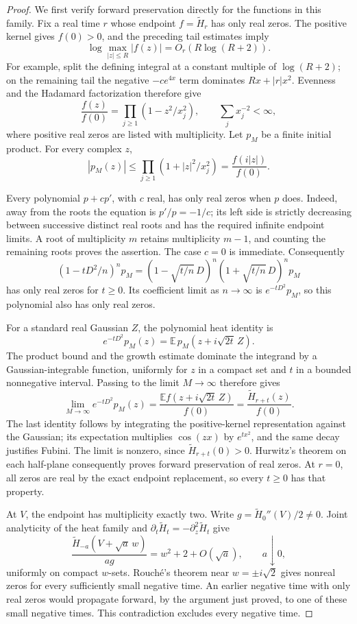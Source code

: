 \begin{proof}
We first verify forward preservation directly for the functions in
this family. Fix a real time \(r\) whose endpoint
\(f=\widetilde H_r\) has only real zeros. The positive kernel gives
\(f(0)>0\), and the preceding tail estimates imply
\[
 \log\max_{|z|\le R}|f(z)|=O_r(R\log(R+2)).
\]
For example, split the defining integral at a constant multiple of
\(\log(R+2)\); on the remaining tail the negative
\(-c e^{4x}\) term dominates \(Rx+|r|x^2\).
Evenness and the Hadamard factorization therefore give
\[
 \frac{f(z)}{f(0)}=\prod_{j\ge1}(1-z^2/x_j^2),
 \qquad \sum_jx_j^{-2}<\infty,
\]
where positive real zeros are listed with multiplicity.
Let \(p_M\) be a finite initial product. For every complex \(z\),
\[
 |p_M(z)|\le\prod_{j\ge1}(1+|z|^2/x_j^2)
             =\frac{f(i|z|)}{f(0)}.
\]

Every polynomial \(p+c p'\), with \(c\) real, has only real zeros
when \(p\) does. Indeed, away from the roots the equation is
\(p'/p=-1/c\); its left side is strictly decreasing between
successive distinct real roots and has the required infinite
endpoint limits. A root of multiplicity \(m\) retains
multiplicity \(m-1\), and counting the remaining roots proves
the assertion. The case \(c=0\) is immediate.
Consequently
\[
 (1-tD^2/n)^n p_M
 = (1-\sqrt{t/n}\,D)^n(1+\sqrt{t/n}\,D)^n p_M
\]
has only real zeros for \(t\ge0\).
Its coefficient limit as \(n\to\infty\) is
\(e^{-tD^2}p_M\), so this polynomial also has only real zeros.

For a standard real Gaussian \(Z\), the polynomial heat identity is
\[
 e^{-tD^2}p_M(z)=\mathbb E\,p_M(z+i\sqrt{2t}\,Z).
\]
The product bound and the growth estimate dominate the integrand
by a Gaussian-integrable function, uniformly for \(z\) in a compact
set and \(t\) in a bounded nonnegative interval. Passing to the
limit \(M\to\infty\) therefore gives
\[
 \lim_{M\to\infty}e^{-tD^2}p_M(z)
 =\frac{\mathbb E f(z+i\sqrt{2t}\,Z)}{f(0)}
 =\frac{\widetilde H_{r+t}(z)}{f(0)}.
\]
The last identity follows by integrating the positive-kernel
representation against the Gaussian; its expectation multiplies
\(\cos(zx)\) by \(e^{t x^2}\), and the same decay justifies Fubini.
The limit is nonzero, since \(\widetilde H_{r+t}(0)>0\).
Hurwitz's theorem on each half-plane consequently proves forward
preservation of real zeros. At \(r=0\), all zeros are real by the
exact endpoint replacement, so every \(t\ge0\) has that property.

At \(V\), the endpoint has multiplicity exactly two. Write
\(g=\widetilde H_0''(V)/2\ne0\).
Joint analyticity of the heat family and
\(\partial_t\widetilde H_t=-\partial_z^2\widetilde H_t\) give
\[
 \frac{\widetilde H_{-a}(V+\sqrt a\,w)}{a g}
          =w^2+2+O(\sqrt a),\qquad a\downarrow0,
\]
uniformly on compact \(w\)-sets.
Rouch\'e's theorem near \(w=\pm i\sqrt2\) gives nonreal zeros
for every sufficiently small negative time.
An earlier negative time with only real zeros would propagate
forward, by the argument just proved, to one of these small
negative times. This contradiction excludes every negative time.
\end{proof}

